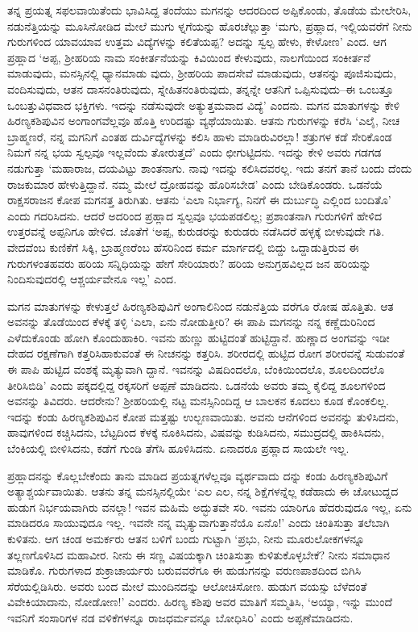 ತನ್ನ ಪ್ರಯತ್ನ ಸಫಲವಾಯಿತೆಂದು ಭಾವಿಸಿದ್ದ ತಂದೆಯು ಮಗನನ್ನು ಆದರದಿಂದ ಅಪ್ಪಿಕೊಂಡು, ತೊಡೆಯ ಮೇಲೇರಿಸಿ, ನಡುನೆತ್ತಿಯನ್ನು ಮೂಸಿನೋಡಿದ ಮೇಲೆ ಮುಗು ಳ್ನಗೆಯನ್ನು ಹೊರಚೆಲ್ಲುತ್ತಾ ‘ಮಗು, ಪ್ರಹ್ಲಾದ, ಇಲ್ಲಿಯವರೆಗೆ ನೀನು ಗುರುಗಳಿಂದ ಯಾವಯಾವ ಉತ್ತಮ ವಿದ್ಯೆಗಳನ್ನು ಕಲಿತೆಯಪ್ಪ? ಅದನ್ನು ಸ್ವಲ್ಪ ಹೇಳು, ಕೇಳೋಣ’ ಎಂದ. ಆಗ ಪ್ರಹ್ಲಾದ ‘ಅಪ್ಪ, ಶ್ರೀಹರಿಯ ನಾಮ ಸಂಕೀರ್ತನೆಯನ್ನು ಕಿವಿಯಿಂದ ಕೇಳುವುದು, ನಾಲಗೆಯಿಂದ ಸಂಕೀರ್ತನೆ ಮಾಡುವುದು, ಮನಸ್ಸಿನಲ್ಲಿ ಧ್ಯಾನಮಾಡು ವುದು, ಶ್ರೀಹರಿಯ ಪಾದಸೇವೆ ಮಾಡುವುದು, ಆತನನ್ನು ಪೂಜಿಸುವುದು, ವಂದಿಸುವುದು, ಆತನ ದಾಸನಂತಿರುವುದು, ಸ್ನೇಹಿತನಂತಿರುವುದು, ತನ್ನನ್ನೇ ಆತನಿಗೆ ಒಪ್ಪಿಸುವುದು–ಈ ಒಂಬತ್ತೂ ಒಂಬತ್ತುವಿಧವಾದ ಭಕ್ತಿಗಳು. ಇದನ್ನು ನಡೆಸುವುದೇ ಅತ್ಯುತ್ತಮವಾದ ವಿದ್ಯೆ’ ಎಂದನು. ಮಗನ ಮಾತುಗಳನ್ನು ಕೇಳಿ ಹಿರಣ್ಯಕಶಿಪುವಿನ ಅಂಗಾಂಗವೆಲ್ಲವೂ ಹೊತ್ತಿ ಉರಿದಷ್ಟು ವ್ಯಥೆಯಾಯಿತು. ಆತನು ಗುರುಗಳನ್ನು ಕರೆಸಿ ‘ಎಲೈ, ನೀಚ ಬ್ರಾಹ್ಮಣರೆ, ನನ್ನ ಮಗನಿಗೆ ಎಂತಹ ದುರ್ವಿದ್ಯೆಗಳನ್ನು ಕಲಿಸಿ ಹಾಳು ಮಾಡಿರುವಿರಲ್ಲಾ! ಶತ್ರುಗಳ ಕಡೆ ಸೇರಿಕೊಂಡ ನಿಮಗೆ ನನ್ನ ಭಯ ಸ್ವಲ್ಪವೂ ಇಲ್ಲವೆಂದು ತೋರುತ್ತದೆ’ ಎಂದು ಛೀಗುಟ್ಟಿದನು. ಇದನ್ನು ಕೇಳಿ ಅವರು ಗಡಗಡ ನಡುಗುತ್ತಾ ‘ಮಹಾರಾಜ, ದಯವಿಟ್ಟು ಶಾಂತನಾಗು. ನಾವು ಇದನ್ನು ಕಲಿಸಿದವರಲ್ಲ. ಇದು ತನಗೆ ತಾನೆ ಬಂದು ದೆಂದು ರಾಜಕುಮಾರ ಹೇಳುತ್ತಿದ್ದಾನೆ. ನಮ್ಮ ಮೇಲೆ ದ್ರೋಹವನ್ನು ಹೊರಿಸಬೇಡ’ ಎಂದು ಬೇಡಿಕೊಂಡರು. ಒಡನೆಯೆ ರಾಕ್ಷಸರಾಜನ ಕೋಪ ಮಗನತ್ತ ತಿರುಗಿತು. ಆತನು ‘ಎಲಾ ನಿರ್ಭಾಗ್ಯ, ನಿನಗೆ ಈ ದುರ್ಬುದ್ಧಿ ಎಲ್ಲಿಂದ ಬಂದಿತೊ’ ಎಂದು ಗದರಿಸಿದನು. ಆದರೆ ಅದರಿಂದ ಪ್ರಹ್ಲಾದ ಸ್ವಲ್ಪವೂ ಭಯಪಡಲಿಲ್ಲ; ಪ್ರಶಾಂತನಾಗಿ ಗುರುಗಳಿಗೆ ಹೇಳಿದ ಉತ್ತರವನ್ನೆ ಅಪ್ಪನಿಗೂ ಹೇಳಿದ. ಜೊತೆಗೆ ‘ಅಪ್ಪ, ಕುರುಡರನ್ನು ಕುರುಡರು ನಡೆಸಿದರೆ ಹಳ್ಳಕ್ಕೆ ಬೀಳುವುದೇ ಗತಿ. ವೇದವೆಂಬ ಕುಣಿಕೆಗೆ ಸಿಕ್ಕಿ, ಬ್ರಾಹ್ಮಣರೆಂಬ ಹೆಸರಿನಿಂದ ಕರ್ಮ ಮಾರ್ಗದಲ್ಲಿ ಬಿದ್ದು ಒದ್ದಾಡುತ್ತಿರುವ ಈ ಗುರುಗಳಂತಹವರು ಹರಿಯ ಸನ್ನಿಧಿಯನ್ನು ಹೇಗೆ ಸೇರಿಯಾರು? ಹರಿಯ ಅನುಗ್ರಹವಿಲ್ಲದ ಜನ ಹರಿಯನ್ನು ನಿಂದಿಸುವುದರಲ್ಲಿ ಆಶ್ಚರ್ಯವೇನೂ ಇಲ್ಲ’ ಎಂದ.

ಮಗನ ಮಾತುಗಳನ್ನು ಕೇಳುತ್ತಲೆ ಹಿರಣ್ಯಕಶಿಪುವಿಗೆ ಅಂಗಾಲಿನಿಂದ ನಡುನೆತ್ತಿಯ ವರೆಗೂ ರೋಷ ಹೊತ್ತಿತು. ಆತ ಅವನನ್ನು ತೊಡೆಯಿಂದ ಕೆಳಕ್ಕೆ ತಳ್ಳಿ ‘ಎಲಾ, ಏನು ನೋಡುತ್ತೀರಿ? ಈ ಪಾಪಿ ಮಗನನ್ನು ನನ್ನ ಕಣ್ಣೆದುರಿನಿಂದ ಎಳೆದುಕೊಂಡು ಹೋಗಿ ಕೊಂದುಹಾಕಿರಿ. ಇವನು ಹುಣ್ಣು ಹುಟ್ಟಿದಂತೆ ಹುಟ್ಟಿದ್ದಾನೆ. ಹುಣ್ಣಾದ ಅಂಗವನ್ನು ಇಡೀ ದೇಹದ ರಕ್ಷಣೆಗಾಗಿ ಕತ್ತರಿಸಿಹಾಕುವಂತೆ ಈ ನೀಚನನ್ನು ಕತ್ತರಿಸಿ. ಶರೀರದಲ್ಲಿ ಹುಟ್ಟಿದ ರೋಗ ಶರೀರವನ್ನೆ ಸುಡುವಂತೆ ಈ ಪಾಪಿ ಹುಟ್ಟಿದ ವಂಶಕ್ಕೆ ಮೃತ್ಯುವಾಗಿ ದ್ದಾನೆ. ಇವನನ್ನು ವಿಷದಿಂದಲೊ, ಬೆಂಕಿಯಿಂದಲೊ, ಶೂಲದಿಂದಲೊ ತೀರಿಸಿಬಿಡಿ’ ಎಂದು ಪಕ್ಕದಲ್ಲಿದ್ದ ರಕ್ಕಸರಿಗೆ ಅಪ್ಪಣೆ ಮಾಡಿದನು. ಒಡನೆಯೆ ಅವರು ತಮ್ಮ ಕೈಲಿದ್ದ ಶೂಲಗಳಿಂದ ಅವನನ್ನು ತಿವಿದರು. ಆದರೇನು? ಶ್ರೀಹರಿಯಲ್ಲಿ ನಟ್ಟ ಮನಸ್ಸಿನಿಂದಿದ್ದ ಆ ಬಾಲಕನ ಕೂದಲು ಕೂಡ ಕೊಂಕಲಿಲ್ಲ. ಇದನ್ನು ಕಂಡು ಹಿರಣ್ಯಕಶಿಪುವಿನ ಕೋಪ ಮತ್ತಷ್ಟು ಉಲ್ಬಣವಾಯಿತು. ಅವನು ಆನೆಗಳಿಂದ ಅವನನ್ನು ತುಳಿಸಿದನು, ಹಾವುಗಳಿಂದ ಕಚ್ಚಿಸಿದನು, ಬೆಟ್ಟದಿಂದ ಕೆಳಕ್ಕೆ ನೂಕಿಸಿದನು, ವಿಷವನ್ನು ಕುಡಿಸಿದನು, ಸಮುದ್ರದಲ್ಲಿ ಹಾಕಿಸಿದನು, ಬೆಂಕಿಯಲ್ಲಿ ಬೀಳಿಸಿದನು, ಕಡೆಗೆ ಗುಂಡಿ ತೆಗೆಸಿ ಹೂಳಿಸಿದನು. ಏನಾದರೂ ಪ್ರಹ್ಲಾದ ಸಾಯಲೇ ಇಲ್ಲ.

ಪ್ರಹ್ಲಾದನನ್ನು ಕೊಲ್ಲಬೇಕೆಂದು ತಾನು ಮಾಡಿದ ಪ್ರಯತ್ನಗಳೆಲ್ಲವೂ ವ್ಯರ್ಥವಾದು ದನ್ನು ಕಂಡು ಹಿರಣ್ಯಕಶಿಪುವಿಗೆ ಅತ್ಯಾಶ್ಚರ್ಯವಾಯಿತು. ಆತನು ತನ್ನ ಮನಸ್ಸಿನಲ್ಲಿಯೇ ‘ಎಲ ಎಲ, ನನ್ನ ಶಿಕ್ಷೆಗಳನ್ನೆಲ್ಲ ಕಡೆಹಾದು ಈ ಚೋಟುದ್ದದ ಹುಡುಗ ನಿರ್ಭಯವಾಗಿರು ವನಲ್ಲಾ! ಇವನ ಮಹಿಮೆ ಅದ್ಭುತವೇ ಸರಿ. ಇವನು ಯಾರಿಗೂ ಹೆದರುವುದೂ ಇಲ್ಲ, ಏನು ಮಾಡಿದರೂ ಸಾಯುವುದೂ ಇಲ್ಲ. ಇವನೇ ನನ್ನ ಮೃತ್ಯುವಾಗುತ್ತಾನೆಯೊ ಏನೊ!’ ಎಂದು ಚಿಂತಿಸುತ್ತಾ ತಲೆಬಾಗಿ ಕುಳಿತನು. ಆಗ ಚಂಡ ಅಮರ್ಕರು ಆತನ ಬಳಿಗೆ ಬಂದು ಗುಟ್ಟಾಗಿ ‘ಪ್ರಭು, ನೀನು ಮೂರುಲೋಕಗಳನ್ನೂ ತಲ್ಲಣಗೊಳಿಸಿದ ಮಹಾವೀರ. ನೀನು ಈ ಸಣ್ಣ ವಿಷಯಕ್ಕಾಗಿ ಚಿಂತಿಸುತ್ತಾ ಕುಳಿತುಕೊಳ್ಳಬೇಕೆ? ನೀನು ಸಮಾಧಾನ ಮಾಡಿಕೊ. ಗುರುಗಳಾದ ಶುಕ್ರಾಚಾರ್ಯರು ಬರುವವರೆಗೂ ಈ ಹುಡುಗನನ್ನು ವರುಣಪಾಶದಿಂದ ಬಿಗಿಸಿ ಸೆರೆಯಲ್ಲಿಡಿಸಿರು. ಅವರು ಬಂದ ಮೇಲೆ ಮುಂದಿನದನ್ನು ಆಲೋಚಿಸೋಣ. ಹುಡುಗ ವಯಸ್ಸು ಬೆಳೆದಂತೆ ವಿವೇಕಿಯಾದಾನು, ನೋಡೋಣ!’ ಎಂದರು. ಹಿರಣ್ಯ ಕಶಿಪು ಅವರ ಮಾತಿಗೆ ಸಮ್ಮತಿಸಿ, ‘ಅಯ್ಯಾ, ಇನ್ನು ಮುಂದೆ ಇವನಿಗೆ ಸಂಸಾರಿಗಳ ನಡ ವಳಿಕೆಗಳನ್ನೂ ರಾಜಧರ್ಮವನ್ನೂ ಬೋಧಿಸಿರಿ’ ಎಂದು ಅಪ್ಪಣೆಮಾಡಿದನು.

